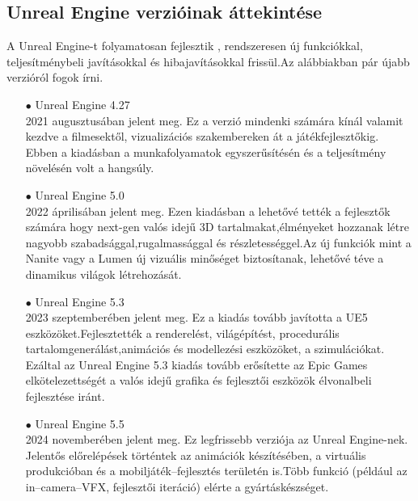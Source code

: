 \documentclass[
]{thesis-ekf}
\theoremstyle{definition}
\theoremstyle{remark}
\begin{document}
\subsection{Unreal Engine verzióinak áttekintése}
A Unreal Engine-t folyamatosan fejlesztik , rendszeresen új funkciókkal, teljesítménybeli javításokkal és hibajavításokkal frissül.Az alábbiakban pár újabb verzióról fogok írni.
\begin{itemize}
	\item[$\bullet$]Unreal Engine 4.27 \\ 2021 augusztusában jelent meg. Ez a verzió mindenki számára kínál valamit kezdve a filmesektől, vizualizációs szakembereken át a játékfejlesztőkig. Ebben a kiadásban a munkafolyamatok egyszerűsítésén és a teljesítmény növelésén volt a hangsúly.\cite{Unreal4.27}
	\item[$\bullet$]Unreal Engine 5.0 \\ 2022 áprilisában jelent meg. Ezen kiadásban a lehetővé tették a fejlesztők számára hogy next-gen valós idejű 3D tartalmakat,élményeket hozzanak létre nagyobb szabadsággal,rugalmassággal és részletességgel.Az új funkciók mint a Nanite vagy a Lumen új vizuális minőséget biztosítanak, lehetővé téve a dinamikus világok létrehozását.\cite{Unreal5.0}
	\item[$\bullet$]Unreal Engine 5.3 \\ 2023 szeptemberében jelent meg. Ez a kiadás tovább javította a UE5 eszközöket.Fejlesztették a renderelést, világépítést, procedurális tartalomgenerálást,animációs és modellezési eszközöket, a szimulációkat. Ezáltal az Unreal Engine 5.3 kiadás tovább erősítette az Epic Games elkötelezettségét a valós idejű grafika és fejlesztői eszközök élvonalbeli fejlesztése iránt.\cite{Unreal5.3}
	\item[$\bullet$]Unreal Engine 5.5 \\ 2024 novemberében jelent meg. Ez legfrissebb verziója az Unreal Engine-nek. Jelentős előrelépések történtek az animációk készítésében, a virtuális produkcióban és a mobiljáték--fejlesztés területén is.Több funkció (például az in--camera--VFX, fejlesztői iteráció) elérte a gyártáskészséget. \cite{Unreal5.5}
\end{itemize}
\end{document}

